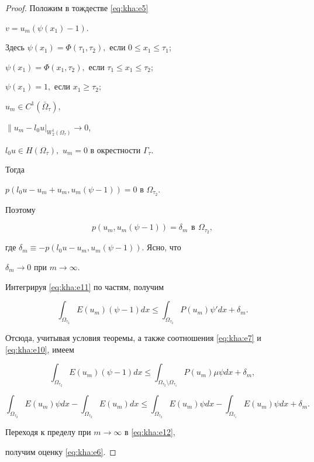 \smallskip



\begin{proof} Положим в тождестве \eqref{eq:kha:e5}

$v=u_m(\psi(x_1)-1).$

Здесь $ \psi(x_1)=\Phi(\tau_1,\tau_2),$ если $0\leqslant x_1\leqslant\tau_1$;

$\psi(x_1)=\Phi(x_1,\tau_2),$ если $\tau_1\leqslant x_1\leqslant\tau_2;$ 

$\psi(x_1)=1,$ если $x_1\geqslant\tau_2;$ 

$ u_m\in C^1(\bar{\Omega}_\tau)$,

$\|u_m-l_0u|_{W_2^1( \Omega_\tau)}\to 0$,

$l_0u\in H(\Omega_\tau),$ $u_m =0$ в окрестности $\Gamma_\tau. $

Тогда

$

p(l_0u-u_m+u_m,u_m(\psi-1))=0$ в $\Omega_{\tau_2}.

$

Поэтому

 \begin{equation}\label{eq:kha:e11}

 p(u_m,u_m(\psi-1))=\delta_m \,\ \text{в} \,\ \Omega_{\tau_2},

 \end{equation}

где $\delta_m \equiv -p(l_0u-u_m,u_m(\psi-1)).$ Ясно, что

$\delta_m\to 0$ при $m\to \infty .$



Интегрируя \eqref{eq:kha:e11} по частям, получим

$$

\int_{\Omega_{\tau_2}}E(u_m)(\psi-1)dx\leqslant\int_{\Omega_{\tau_2}}P(u_m)\psi' dx+\delta_m.

$$

Отсюда, учитывая условия теоремы,  а также соотношения \eqref{eq:kha:e7} и \eqref{eq:kha:e10}, имеем

$$

\int_{\Omega_{\tau_2}}E(u_m)(\psi-1)dx\leqslant

\int_{\Omega_{\tau_2}\setminus\Omega_{\tau_1}}P(u_m)\mu\psi

dx+\delta_m,

$$

\begin{equation}\label{eq:kha:e12}

\int_{\Omega_{\tau_2}}E(u_m)\psi

dx-\int_{\Omega_{\tau_2}}E(u_m)dx\leqslant

\int_{\Omega_{\tau_2}}E(u_m)\psi

dx-\int_{\Omega_{\tau_1}}E(u_m)\psi dx+\delta_m.

\end{equation}

Переходя к пределу при $m\to\infty$ в \eqref{eq:kha:e12},

получим оценку \eqref{eq:kha:e6}.

\end{proof}



